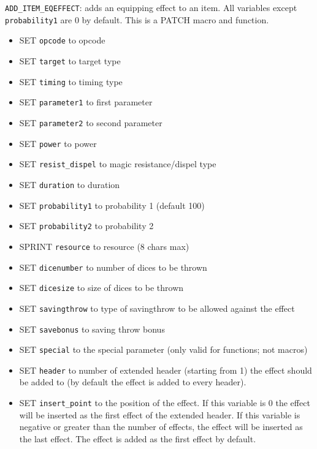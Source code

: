 \documentclass{article}
\begin{document}
\verb+ADD_ITEM_EQEFFECT+: adds an equipping effect to an item. All variables except \verb+probability1+ are 0 by default.
This is a PATCH macro and function.
\begin{itemize}
\item SET \verb+opcode+ to opcode
\item SET \verb+target+ to target type
\item SET \verb+timing+ to timing type
\item SET \verb+parameter1+ to first parameter
\item SET \verb+parameter2+ to second parameter
\item SET \verb+power+ to power
\item SET \verb+resist_dispel+ to magic resistance/dispel type
\item SET \verb+duration+ to duration
\item SET \verb+probability1+ to probability 1 (default 100)
\item SET \verb+probability2+ to probability 2
\item SPRINT \verb+resource+ to resource (8 chars max)
\item SET \verb+dicenumber+ to number of dices to be thrown
\item SET \verb+dicesize+ to size of dices to be thrown
\item SET \verb+savingthrow+ to type of savingthrow to be allowed against the effect
\item SET \verb+savebonus+ to saving throw bonus
\item SET \verb+special+ to the special parameter (only valid for functions; not macros)
\item SET \verb+header+ to number of extended header (starting from 1) the effect should be added to (by default the effect is added to every header).
\item SET \verb+insert_point+ to the position of the effect. If this variable is 0 the effect will be inserted as the first effect of the extended header. If this variable is negative or greater than the number of effects, the effect will be inserted as the last effect. The effect is added as the first effect by default.
\end{itemize}
\end{document}
